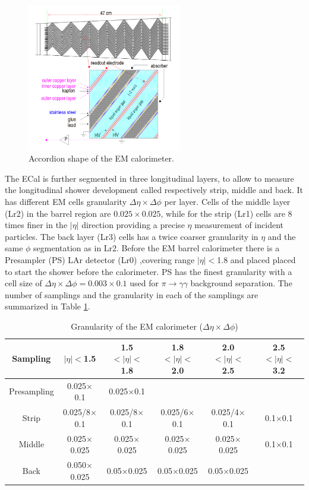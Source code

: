\begin{figure}[H]
    \centering
    \includegraphics[width=0.6\textwidth]{Ch2/Img/ECal_accord.png}
    \caption{Accordion shape of the EM calorimeter.}
    \label{fig:chap2:ATLAS:Calo:ECal:Acc}
\end{figure}
The ECal is further segmented in three longitudinal layers, to allow to measure the longitudinal shower development called respectively strip, middle and back. It has different EM cells granularity $\Delta\eta\times\Delta\phi$ per layer. Cells of the middle layer (Lr2) in the barrel region are $0.025\times0.025$, while for the strip (Lr1) cells are 8 times finer in the $|\eta|$ direction providing a precise $\eta$ measurement of incident particles. The back layer (Lr3) cells has a twice coarser granularity in $\eta$ and the same $\phi$ segmentation as in Lr2. Before the EM barrel calorimeter there is a Presampler (PS) LAr detector (Lr0) ,covering range $|\eta|<$1.8 and placed placed to start the shower before the calorimeter. PS has the finest granularity with a cell size of $\Delta\eta\times\Delta\phi = 0.003\times0.1$ used for $\pi\rightarrow\gamma\gamma$ background separation. The number of samplings  and the granularity in each of the samplings are summarized in Table \ref{tab:chap2:ATLAS:Calo:ECal:Gr}.
\begin{table}[ht]
    \centering
    \begin{tabular}{cccccc}
    \hline
    Sampling & $|\eta|<$1.5 & 1.5$<|\eta|<$1.8 & 1.8$<|\eta|<$2.0 & 2.0$<|\eta|<$2.5 & 2.5$<|\eta|<$3.2 \\
    \hline
    \hline
        Presampling & 0.025$\times$0.1 & 0.025$\times$0.1  \\
        Strip & 0.025/8$\times$0.1 & 0.025/8$\times$0.1 & 0.025/6$\times$0.1 & 0.025/4$\times$0.1 & 0.1$\times$0.1 \\
        Middle & 0.025$\times$0.025 & 0.025$\times$0.025 & 0.025$\times$0.025 & 0.025$\times$0.025 & 0.1$\times$0.1 \\
        Back & 0.050$\times$0.025 & 0.05$\times$0.025 & 0.05$\times$0.025 & 0.05$\times$0.025 \\
        \hline
    \end{tabular}
    \caption{Granularity of the EM calorimeter ($\Delta\eta\times\Delta\phi$)}
    \label{tab:chap2:ATLAS:Calo:ECal:Gr}
\end{table}
